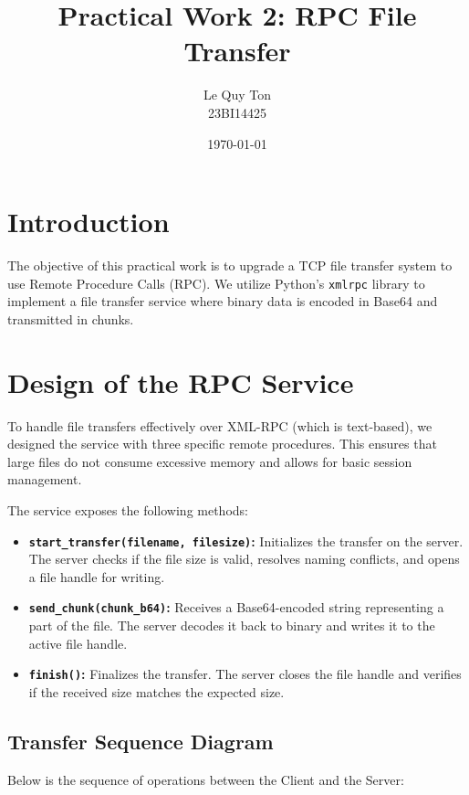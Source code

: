 \documentclass[a4paper,12pt]{article}
\title{\textbf{Practical Work 2: RPC File Transfer}}
\author{Le Quy Ton \\ 23BI14425}
\date{\today}
\begin{document}
\maketitle

\section{Introduction}
The objective of this practical work is to upgrade a TCP file transfer system to use Remote Procedure Calls (RPC). We utilize Python's \texttt{xmlrpc} library to implement a file transfer service where binary data is encoded in Base64 and transmitted in chunks.

\section{Design of the RPC Service}
To handle file transfers effectively over XML-RPC (which is text-based), we designed the service with three specific remote procedures. This ensures that large files do not consume excessive memory and allows for basic session management.

The service exposes the following methods:

\begin{itemize}
    \item \textbf{\texttt{start\_transfer(filename, filesize)}:} 
    Initializes the transfer on the server. The server checks if the file size is valid, resolves naming conflicts, and opens a file handle for writing.
    
    \item \textbf{\texttt{send\_chunk(chunk\_b64)}:} 
    Receives a Base64-encoded string representing a part of the file. The server decodes it back to binary and writes it to the active file handle.
    
    \item \textbf{\texttt{finish()}:} 
    Finalizes the transfer. The server closes the file handle and verifies if the received size matches the expected size.
\end{itemize}

\subsection{Transfer Sequence Diagram}
Below is the sequence of operations between the Client and the Server:
\end{document}

